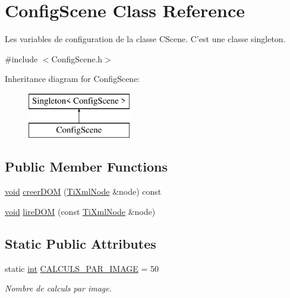 \hypertarget{class_config_scene}{\section{Config\-Scene Class Reference}
\label{class_config_scene}
}


Les variables de configuration de la classe C\-Scene. C'est une classe singleton.  




{\ttfamily \#include $<$Config\-Scene.\-h$>$}

Inheritance diagram for Config\-Scene\-:\begin{figure}[H]
\begin{center}
\leavevmode
\includegraphics[height=2.000000cm]{class_config_scene}
\end{center}
\end{figure}
\subsection*{Public Member Functions}
\begin{DoxyCompactItemize}
\item 
\hyperlink{wglew_8h_aeea6e3dfae3acf232096f57d2d57f084}{void} \hyperlink{group__inf2990_gad74111f597fd4d2f58a08c6dedcb4270}{creer\-D\-O\-M} (\hyperlink{class_ti_xml_node}{Ti\-Xml\-Node} \&node) const 
\item 
\hyperlink{wglew_8h_aeea6e3dfae3acf232096f57d2d57f084}{void} \hyperlink{group__inf2990_gaa29c1518d06292658bfd90d3c6d379d3}{lire\-D\-O\-M} (const \hyperlink{class_ti_xml_node}{Ti\-Xml\-Node} \&node)
\end{DoxyCompactItemize}
\subsection*{Static Public Attributes}
\begin{DoxyCompactItemize}
\item 
static \hyperlink{wglew_8h_a500a82aecba06f4550f6849b8099ca21}{int} \hyperlink{group__inf2990_gadb487b450a0314a5d1f75cf31ce502eb}{C\-A\-L\-C\-U\-L\-S\-\_\-\-P\-A\-R\-\_\-\-I\-M\-A\-G\-E} = 50
\begin{DoxyCompactList}\small\item\em Nombre de calculs par image. \end{DoxyCompactList}\end{DoxyCompactItemize}
